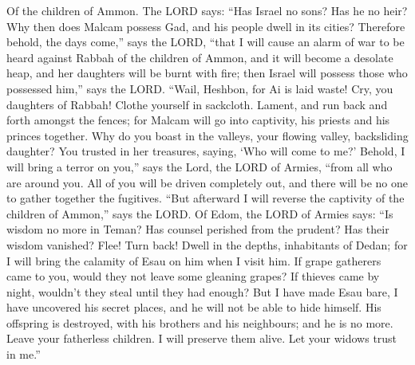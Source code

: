  Of the children of Ammon. The LORD says: ``Has Israel no
sons? Has he no heir? Why then does Malcam possess Gad, and his people
dwell in its cities?  Therefore behold, the days come,''
says the LORD, ``that I will cause an alarm of war to be heard against
Rabbah of the children of Ammon, and it will become a desolate heap, and
her daughters will be burnt with fire; then Israel will possess those
who possessed him,'' says the LORD.  ``Wail, Heshbon, for Ai
is laid waste! Cry, you daughters of Rabbah! Clothe yourself in
sackcloth. Lament, and run back and forth amongst the fences; for Malcam
will go into captivity, his priests and his princes together.
 Why do you boast in the valleys, your flowing valley,
backsliding daughter? You trusted in her treasures, saying, `Who will
come to me?'  Behold, I will bring a terror on you,'' says
the Lord, the LORD of Armies, ``from all who are around you. All of you
will be driven completely out, and there will be no one to gather
together the fugitives.  ``But afterward I will reverse the
captivity of the children of Ammon,'' says the LORD.  Of
Edom, the LORD of Armies says: ``Is wisdom no more in Teman? Has counsel
perished from the prudent? Has their wisdom vanished?  Flee!
Turn back! Dwell in the depths, inhabitants of Dedan; for I will bring
the calamity of Esau on him when I visit him.  If grape
gatherers came to you, would they not leave some gleaning grapes? If
thieves came by night, wouldn't they steal until they had enough?
 But I have made Esau bare, I have uncovered his secret
places, and he will not be able to hide himself. His offspring is
destroyed, with his brothers and his neighbours; and he is no more.
 Leave your fatherless children. I will preserve them
alive. Let your widows trust in me.''

